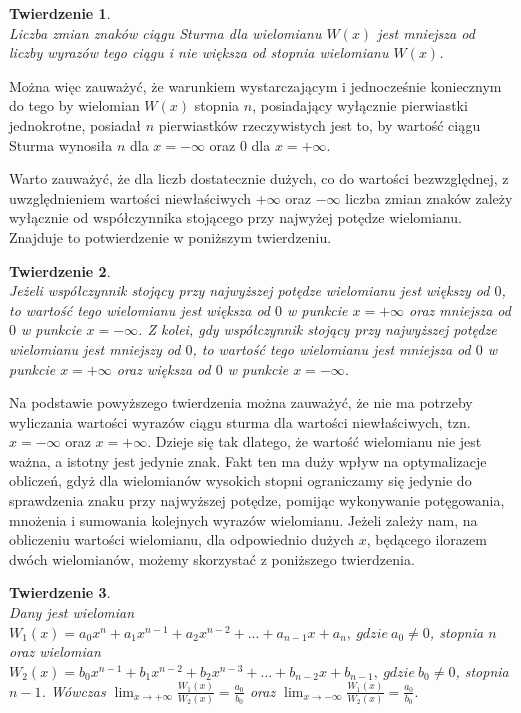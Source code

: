\documentclass[oneside,a4paper]{book}
\newtheorem{theorem}{Twierdzenie}
\begin{document}
	\begin{theorem}
		$ $ \\
		Liczba zmian znaków ciągu Sturma dla wielomianu $W(x)$ jest mniejsza od liczby wyrazów tego ciągu i nie większa od stopnia wielomianu $W(x)$.
	\end{theorem}
	
	Można więc zauważyć, że warunkiem wystarczającym i jednocześnie koniecznym do tego by wielomian $W(x)$ stopnia $n$, posiadający wyłącznie pierwiastki jednokrotne, posiadał $n$ pierwiastków rzeczywistych jest to, by wartość ciągu Sturma wynosiła $n$ dla $x=-\infty$ oraz $0$ dla $x=+\infty$. 
	
	Warto zauważyć, że dla liczb dostatecznie dużych, co do wartości bezwzględnej, z uwzględnieniem wartości niewłaściwych $+\infty$ oraz $-\infty$ liczba zmian znaków zależy wyłącznie od współczynnika stojącego przy najwyżej potędze wielomianu. Znajduje to potwierdzenie w poniższym twierdzeniu.
	
	\begin{theorem}
		$ $ \\
		Jeżeli współczynnik stojący przy najwyższej potędze wielomianu jest większy od $0$, to wartość tego wielomianu jest większa od $0$ w punkcie $x=+\infty$ oraz mniejsza od $0$ w punkcie $x=-\infty$.
		Z kolei, gdy współczynnik stojący przy najwyższej potędze wielomianu jest mniejszy od $0$, to wartość tego wielomianu jest mniejsza od $0$ w punkcie $x=+\infty$ oraz większa od $0$ w punkcie $x=-\infty$.
	\end{theorem}
	
	Na podstawie powyższego twierdzenia można zauważyć, że nie ma potrzeby wyliczania wartości wyrazów ciągu sturma dla wartości niewłaściwych, tzn. $x=-\infty$ oraz $x=+\infty.$ Dzieje się tak dlatego, że wartość wielomianu nie jest ważna, a istotny jest jedynie znak. Fakt ten ma duży wpływ na optymalizacje obliczeń, gdyż dla wielomianów wysokich stopni ograniczamy się jedynie do sprawdzenia znaku przy najwyższej potędze, pomijąc wykonywanie potęgowania, mnożenia i sumowania kolejnych wyrazów wielomianu.
	Jeżeli zależy nam, na obliczeniu wartości wielomianu, dla odpowiednio dużych $x$, będącego ilorazem dwóch wielomianów, możemy skorzystać z poniższego twierdzenia.
	
	\begin{theorem}
		$ $ \\
		Dany jest wielomian $W_1(x) = a_0x^n + a_1x^{n-1} + a_2x^{n-2} + ... + a_{n-1}x + a_n,\ gdzie \ a_0 \ne 0$, stopnia $n$ oraz wielomian $W_2(x) = b_0x^{n-1} + b_1x^{n-2} + b_2x^{n-3} + ... + b_{n-2}x + b_{n-1},\ gdzie\ b_0 \ne 0$, stopnia $n-1$. Wówczas $\lim_{x \to +\infty}\frac{W_1(x)}{W_2(x)} = \frac{a_0}{b_0}$ oraz $\lim_{x \to -\infty}\frac{W_1(x)}{W_2(x)} = \frac{a_0}{b_0}.$
	\end{theorem}
	
\end{document}
